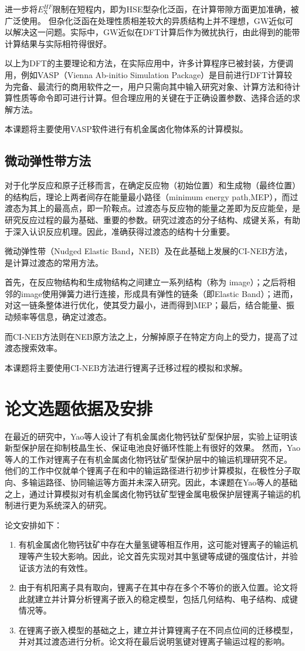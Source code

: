 进一步将$E^{HF}_{\mathrm{X}}$限制在短程内，即为HSE型杂化泛函，在计算带隙方面更加准确，被广泛使用。
但杂化泛函在处理性质相差较大的异质结构上并不理想，GW近似可以解决这一问题。实际中，GW近似在DFT计算后作为微扰执行，由此得到的能带计算结果与实际相符得很好。

以上为DFT的主要理论和方法，在实际应用中，许多计算程序已被封装，方便调用，例如VASP（Vienna Ab-initio Simulation Package）是目前进行DFT计算较为完备、最流行的商用软件之一，用户只需向其中输入研究对象、计算方法和待计算性质等命令即可进行计算。但合理应用的关键在于正确设置参数、选择合适的求解方法。

本课题将主要使用VASP软件进行有机金属卤化物体系的计算模拟。

\subsection{微动弹性带方法}

对于化学反应和原子迁移而言，在确定反应物（初始位置）和生成物（最终位置）的结构后，理论上两者间存在能量最小路径（minimum energy path,MEP），而过渡态为其上的最高点，即一阶鞍点。过渡态与反应物的能量之差即为反应能垒，是研究反应过程的最为基础、重要的参数。研究过渡态的分子结构、成键关系，有助于深入认识反应机理。因此，准确获得过渡态的结构十分重要。

微动弹性带（Nudged Elastic Band，NEB）及在此基础上发展的CI-NEB方法，是计算过渡态的常用方法。

首先，在反应物结构和生成物结构之间建立一系列结构（称为 image）；之后将相邻的image使用弹簧力进行连接，形成具有弹性的链条（即Elastic Band）；进而，对这一链条整体进行优化，使其受力最小，进而得到MEP；最后，结合能量、振动频率等信息，确定过渡态。

而CI-NEB方法则在NEB原方法之上，分解掉原子在特定方向上的受力，提高了过渡态搜索效率。

本课题将主要使用CI-NEB方法进行锂离子迁移过程的模拟和求解。

\section{论文选题依据及安排}

在最近的研究中，Yao等人设计了有机金属卤化物钙钛矿型保护层，实验上证明该新型保护层在抑制枝晶生长、保证电池良好循环性能上有很好的效果。
然而，Yao等人的工作对锂离子在有机金属卤化物钙钛矿型保护层中的输运机理研究不足。
他们的工作中仅就单个锂离子在和中的输运路径进行初步计算模拟，在极性分子取向、多输运路径、协同输运等方面并未深入研究。因此，本课题在Yao等人的基础之上，通过计算模拟对有机金属卤化物钙钛矿型锂金属电极保护层锂离子输运的机制进行更为系统深入的研究。

论文安排如下：

\begin{enumerate}
    \item 有机金属卤化物钙钛矿中存在大量氢键等相互作用，这可能对锂离子的输运机理等产生较大影响。因此，论文首先实现对其中氢键等成键的强度估计，并验证该方法的有效性。
    \item 由于有机阳离子具有取向，锂离子在其中存在多个不等价的嵌入位置。论文将此就建立并计算分析锂离子嵌入的稳定模型，包括几何结构、电子结构、成键情况等。
    \item 在锂离子嵌入模型的基础之上，建立并计算锂离子在不同点位间的迁移模型，并对其过渡态进行分析。论文将在最后说明氢键对锂离子输运过程的影响。
\end{enumerate}

